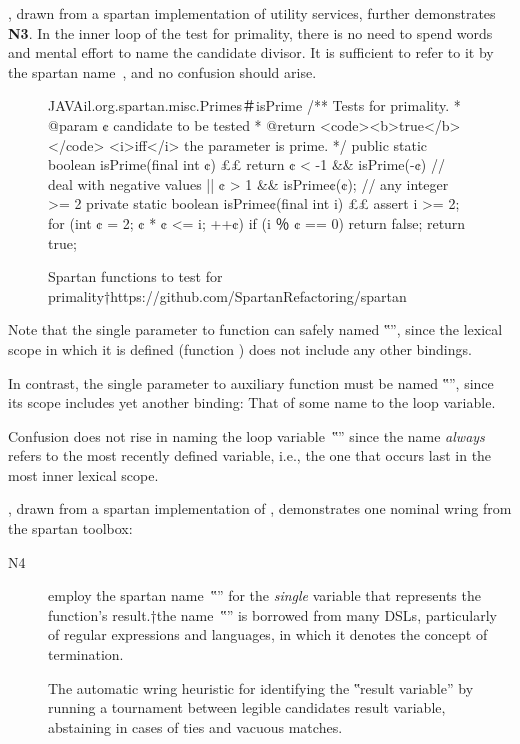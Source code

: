 , drawn from a spartan implementation of
utility services,
  further demonstrates \textbf{N3}. In the inner loop of the test for
  primality, there is no need to spend words and mental effort to name the
  candidate divisor. It is sufficient to refer to it by the spartan
  name~, and no confusion should arise.

\begin{figure}
\caption{\label{figure:primality}
  Spartan functions to test for primality†{https://github.com/SpartanRefactoring/spartan}
 }
\begin{Code}{JAVA}{il.org.spartan.misc.Primes＃isPrime}
/** Tests for primality.
  * @param ¢ candidate to be tested
  * @return <code><b>true</b></code> <i>iff</i> the parameter is prime. */
public static boolean isPrime(final int ¢) {££
  return ¢ < -1 && isPrime(-¢) // deal with negative values
      || ¢ > 1 && isPrime¢(¢); // any integer >= 2
}
private static boolean isPrime¢(final int i) {££
  assert i >= 2;
  for (int ¢ = 2; ¢ * ¢ <= i; ++¢)
    if (i ％ ¢ == 0)
      return false;
  return true;
}
\end{Code}
\end{figure}

Note that the single parameter to function  can safely named
‟”, since the lexical scope in which it is defined (function
) does not include any other bindings.

In contrast, the single parameter to auxiliary  function
 must be named ‟”, since its scope includes yet another
binding: That of some name to the loop variable.

Confusion does not rise in naming the loop variable~‟” since the name
\emph{always} refers to the most recently defined variable, i.e., the one that
occurs last in the most inner lexical scope.

, drawn from a spartan implementation of
\Prolog{}, demonstrates one nominal wring
from the spartan toolbox:
\begin{description}
\item[N4] employ the spartan name~‟\cc{\$}” for
  the \emph{single} variable that represents the function's result.†{the
    name~‟\cc{\$}” is borrowed from many DSLs, particularly of regular
  expressions and languages, in which it denotes the concept of termination.}

  The automatic wring heuristic for identifying the ‟result variable”
  by running a tournament between legible candidates result variable,
  abstaining in cases of ties and vacuous matches.
\end{description}

